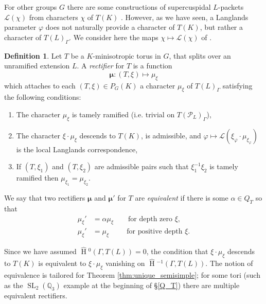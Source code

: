 \documentclass{compositio}
\theoremstyle{plain}
\newcommand{\HT}[1]{\hat{\HH}{}^{#1}}
\theoremstyle{definition}
\newtheorem{definition}[theorem]{Definition}
\DeclareMathOperator{\HH}{H}
\DeclareMathOperator{\SL}{SL}
\newcommand{\PL}{\mathcal{P}_L}
\newcommand{\Lpack}{\mathcal{L}}
\newcommand{\bmu}{\boldsymbol\mu}
\begin{document}
For other groups $G$ there are some constructions of supercuspidal $L$-packets $\Lpack(\chi)$
from characters $\chi$ of $T(K)$ \cite{reeder-debacker:09a, kaletha:13a, reeder:08a}.
However, as we have seen, a Langlands parameter $\varphi$ does not naturally
provide a character of $T(K)$, but rather a character of
$T(L)_{\Gamma}$.  We consider here the maps $\chi \mapsto \Lpack(\chi)$ of \cite{reeder-debacker:09a, reeder:08a}.

\begin{definition} \label{def:rectifier}
  Let $T$ be a $K$-minisotropic torus in $G$, that splits over an unramified
  extension $L$.  A \emph{rectifier} for $T$ is a function
  $$\bmu : (T, \xi) \mapsto \mu_{\xi}$$
  which attaches to each $(T, \xi) \in P_G(K)$ a character
  $\mu_{\xi}$ of $T(L)_{\Gamma}$ satisfying the following conditions:

\begin{enumerate}
\item The character $\mu_{\xi}$ is tamely ramified (i.e. trivial on
  $T(\PL)_{\Gamma}$),

\item The character $\xi \cdot \mu_{\xi}$ descends to $T(K)$, is admissible,
and $\varphi \mapsto \Lpack(\xi_{\varphi} \cdot \mu_{\xi_{\varphi}})$
  is the local Langlands correspondence,

\item If $(T, \xi_1)$ and $(T, \xi_2)$ are admissible pairs such that
$\xi_1^{-1} \xi_2$ is tamely ramified then
$\mu_{\xi_1} = \mu_{\xi_2}$.
\end{enumerate}
We say that two rectifiers $\bmu$ and $\bmu'$ for $T$ are \emph{equivalent}
if there is some $\alpha \in Q_T$ so that
\begin{align*}
\mu_\xi' &= \alpha \mu_\xi \qquad \mbox{for depth zero $\xi$,} \\
\mu_\xi' &= \mu_\xi \qquad\ \  \mbox{for positive depth $\xi$.}
\end{align*}

\end{definition}

Since we have assumed $\HT{0}(\Gamma,T(L)) = 0$, the condition that $\xi \cdot \mu_\xi$
descends to $T(K)$ is equivalent to $\xi \cdot \mu_\xi$ vanishing on $\HT{-1}(\Gamma, T(L))$.  The
notion of equivalence is tailored for Theorem \ref{thm:unique_semisimple}; for some tori (such as the
$\SL_2(\mathbb{Q}_3)$ example at the beginning of \S \ref{Q_T}) there are
multiple equivalent rectifiers.
\end{document}
